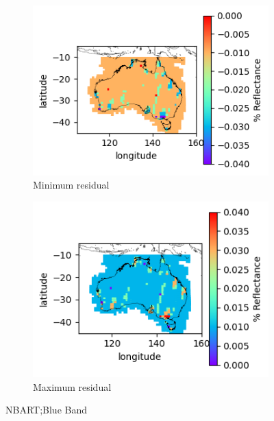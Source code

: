 \documentclass[a4paper]{article}
\begin{document}
      \begin{figure}[h!]
        \centering
          \begin{subfigure}[l]{.4\linewidth}
            \hspace{-32mm}
            \includegraphics[scale=0.9]{plots/nbart/nbart_blue-MinResidual.png}
            \caption{Minimum residual}
          \end{subfigure}
%
          \begin{subfigure}[r]{.4\linewidth}
            \includegraphics[scale=0.9]{plots/nbart/nbart_blue-MaxResidual.png}
            \caption{Maximum residual}
          \end{subfigure}
        \caption{NBART;\@ Blue Band}\label{figure:3}
      \end{figure}
\end{document}
